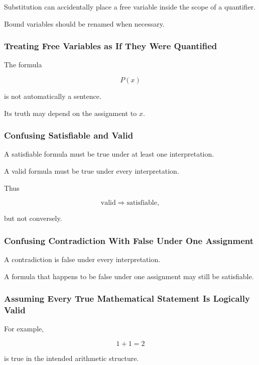 Substitution can accidentally place a free variable inside the scope of a
quantifier.

Bound variables should be renamed when necessary.

\subsubsection{Treating Free Variables as If They Were Quantified}

The formula

\[
P(x)
\]

is not automatically a sentence.

Its truth may depend on the assignment to \(x\).

\subsubsection{Confusing Satisfiable and Valid}

A satisfiable formula must be true under at least one interpretation.

A valid formula must be true under every interpretation.

Thus

\[
\boxed{
\text{valid}
\Longrightarrow
\text{satisfiable},
}
\]

but not conversely.

\subsubsection{Confusing Contradiction With False Under One Assignment}

A contradiction is false under every interpretation.

A formula that happens to be false under one assignment may still be
satisfiable.

\subsubsection{Assuming Every True Mathematical Statement Is Logically Valid}

For example,

\[
1+1=2
\]

is true in the intended arithmetic structure.


